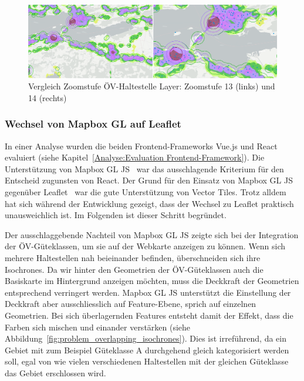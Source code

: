 \begin{figure}[ht]
    \centering
    \includegraphics[width=1.0\linewidth]{projectdoc/img/zoom-level-comparison.png}
    \caption[Vergleich Zoom-Stufe ÖV-Haltestelle Layer]{Vergleich Zoomstufe ÖV-Haltestelle Layer: Zoomstufe 13 (links) und 14 (rechts)}
    \label{fig:zoom-level-comparison}
\end{figure}


\subsubsection{Wechsel von Mapbox GL auf Leaflet}

In einer Analyse wurden die beiden Frontend-Frameworks Vue.js und React evaluiert (siehe Kapitel~\ref{Analyse:Evaluation Frontend-Framework}).
Die Unterstützung von Mapbox GL JS~\cite{mapbox_gl_js} war das ausschlagende Kriterium für den Entscheid zugunsten von React.
Der Grund für den Einsatz von Mapbox GL JS gegenüber Leaflet~\cite{leaflet} war die gute Unterstützung von Vector Tiles.
Trotz alldem hat sich während der Entwicklung gezeigt, dass der Wechsel zu Leaflet praktisch unausweichlich ist.
Im Folgenden ist dieser Schritt begründet.

Der ausschlaggebende Nachteil von Mapbox GL JS zeigte sich bei der Integration der \acs{ÖV}-Güteklassen, um sie auf der Webkarte anzeigen zu können.
Wenn sich mehrere Haltestellen nah beieinander befinden, überschneiden sich ihre \glspl{Isochrone}.
Da wir hinter den Geometrien der \acs{ÖV}-Güteklassen auch die Basiskarte im Hintergrund anzeigen möchten, muss die Deckkraft der Geometrien entsprechend verringert werden.
Mapbox GL JS unterstützt die Einstellung der Deckkraft aber ausschliesslich auf Feature-Ebene, sprich auf einzelnen Geometrien.
Bei sich überlagernden Features entsteht damit der Effekt, dass die Farben sich mischen und einander verstärken (siehe Abbildung~\ref{fig:problem_overlapping_isochrones}).
Dies ist irreführend, da ein Gebiet mit zum Beispiel Güteklasse A durchgehend gleich kategorisiert werden soll, egal von wie vielen verschiedenen Haltestellen mit der gleichen Güteklasse das Gebiet erschlossen wird.


